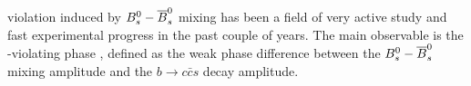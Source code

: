 %
%
%



\CP violation induced by $\Bs-\Bsbar$ mixing
has been a field of 
very active study and fast experimental progress 
in the past couple of years.
The main observable is the 
\CP-violating phase \phiccbars, defined as 
the weak phase difference between
the $\Bs-\Bsbar$ mixing amplitude
and the $b \to c\bar{c}s$ decay amplitude.

